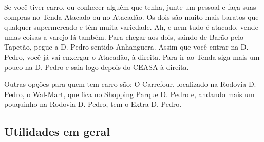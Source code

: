 Se você tiver carro, ou conhecer alguém que tenha, junte um pessoal e faça suas
compras no Tenda Atacado ou no Atacadão. Os dois são muito mais baratos que
qualquer supermercado e têm muita variedade. Ah, e nem tudo é atacado, vende
umas coisas a varejo lá também. Para chegar aos dois, saindo de Barão pelo
Tapetão, pegue a D. Pedro sentido Anhanguera. Assim que você entrar na D. Pedro,
você já vai enxergar o Atacadão, à direita. Para ir ao Tenda siga mais um pouco
na D. Pedro e saia logo depois do CEASA à direita.

Outras opções para quem tem carro são: O Carrefour, localizado na Rodovia D.
Pedro, o Wal-Mart, que fica no Shopping Parque D. Pedro e, andando mais um 
pouquinho na Rodovia D. Pedro, tem o Extra D. Pedro.

\subsection{Utilidades em geral}

